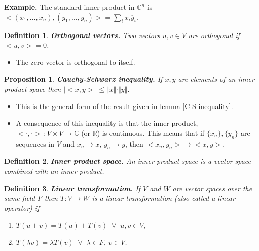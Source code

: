 \documentclass[two column]{article}
\newtheorem{proposition}[theorem]{Proposition}
\newtheorem{definition}{Definition}[subsection]
\begin{document}
{\bf Example.} The standard inner product in $\mathbb{C}^{n}$ is $<(x_{1}, \dots, x_{n}), (y_{1}, \dots, y_{n})> = \sum_{i} x_{i}\overline{y}_{i}$. \\

\begin{definition}
{\bf Orthogonal vectors.} Two vectors $u,v \in V$ are orthogonal if $< u,v > = 0$. 
\end{definition}
\begin{itemize} \vspace{-5pt}
\item The zero vector is orthogonal to itself. \\
\end{itemize}

\begin{proposition}
{\bf Cauchy-Schwarz inequality.} If $x, y$ are elements of an inner product space then $\vert < x,y > \vert \leq \Vert x \Vert \cdot \Vert y \Vert$.
\end{proposition}
\begin{itemize}
\item This is the general form of the result given in lemma \ref{C-S inequality}. 
\item A consequence of this inequality is that the inner product, $<\cdot,\cdot> \: : V \times V \rightarrow \mathbb{C}$ (or $\mathbb{R}$) is continuous. This means that if $\{x_{n} \}, \{y_
{n} \}$ are sequences in $V$ and $x_{n} \rightarrow x$, $y_{n} \rightarrow y$, then $<x_{n},y_{n}> \rightarrow <x,y>$. \\
\end{itemize}

\begin{definition}
{\bf Inner product space.} An inner product space is a vector space combined with an inner product. \\
\end{definition}

\begin{definition} \label{linear transformation}
{\bf Linear transformation.} If $V$ and $W$ are vector spaces over the same field $F$ then $T: V \rightarrow W$ is a linear transformation (also called a linear operator) if 
\begin{enumerate}
\item $T(u + v) = T(u) + T(v) \;\; \forall \;\; u,v \in V$,
\item $T(\lambda v) = \lambda T(v) \;\; \forall \;\; \lambda \in F, \: v \in V$.\\
\end{enumerate}
\end{definition}
\end{document}
